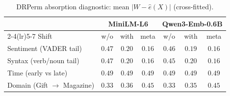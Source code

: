 \documentclass[11pt]{article}
\begin{document}
\begin{table}[ht]
\centering
\caption{DRPerm absorption diagnostic: mean $|W-\hat e(X)|$ (cross-fitted).}
\label{tab:amazon_dr_absorb}
\begin{tabular}{lcccccc}
\toprule
 & \multicolumn{3}{c}{MiniLM-L6} & \multicolumn{3}{c}{Qwen3-Emb-0.6B} \\
\cmidrule(lr){2-4}\cmidrule(lr){5-7}
Shift & w/o & with & meta & w/o & with & meta \\
\midrule
Sentiment (VADER tail) & $0.47$ & $0.20$ & $0.16$ & $0.46$ & $0.19$ & $0.16$ \\
Syntax (verb/noun tail) & $0.47$ & $0.20$ & $0.16$ & $0.45$ & $0.20$ & $0.16$ \\
Time (early vs late) & $0.49$ & $0.49$ & $0.49$ & $0.49$ & $0.49$ & $0.49$ \\
Domain (Gift $\to$ Magazine) & $0.33$ & $0.36$ & $0.45$ & $0.33$ & $0.35$ & $0.45$ \\
\bottomrule
\end{tabular}
\end{table}
\end{document}
